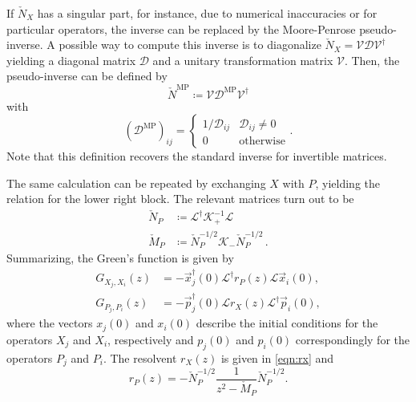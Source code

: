 \documentclass[
    reprint, 
    aps,
    preprintnumbers,
    twocolumn,
    prb,
    superscriptaddress
]{revtex4-2}
\newcommand{\bs}{\begin{subequations}}
\newcommand{\es}{\end{subequations}}
\begin{document}
If $\check{N}_X$ has a singular part, for instance, due to numerical inaccuracies or for particular operators, 
the inverse can be replaced by the Moore-Penrose pseudo-inverse. 
A possible way to compute this inverse is to diagonalize 
$\check{N}_X = \mathcal{V} \mathcal{D} \mathcal{V}^\dagger$ yielding a diagonal matrix $\mathcal{D}$ and a unitary transformation matrix $\mathcal{V}$. 
Then, the pseudo-inverse can be defined by
\begin{equation}
    \check{N}^{\mathrm{MP}} \coloneqq \mathcal{V} \mathcal{D}^{\mathrm{MP}} \mathcal{V}^\dagger
\end{equation}
with
\begin{equation}
    (\mathcal{D}^{\mathrm{MP}})_{ij} = \begin{cases}
        1/\mathcal{D}_{ij} & \mathcal{D}_{ij} \neq 0 \\ 0 & \text{otherwise}
    \end{cases}.
\end{equation}
Note that this definition recovers the standard inverse for invertible matrices.

The same calculation can be repeated by exchanging $X$ with $P$, yielding the relation for the lower right block.
The relevant matrices turn out to be 
\bs
\begin{align}
    \check{N}_P &\coloneqq \mathcal{L}^\dagger \mathcal{K}_+^{-1} \mathcal{L}
		\\
		\check{M}_P &\coloneqq \check{N}_P^{-1/2} \mathcal{K}_- \check{N}_P^{-1/2}\,.
\end{align}
\es
Summarizing, the Green's function is given by
\begin{subequations}
    \begin{align}
        G_{X_j,X_i}  (z) &= - \vec{x}_j^\dagger (0) \mathcal{L}^\dagger r_P (z) \mathcal{L} \vec{x}_i(0), 
				\\
        G_{P_j,P_i} (z) &= - \vec{p}_j^\dagger (0) \mathcal{L} r_X (z) \mathcal{L}^\dagger \vec{p}_i(0),
    \end{align}
\end{subequations}
where the vectors $x_j(0)$ and $x_i(0)$ describe the initial conditions for the operators
$X_j$ and $X_i$, respectively and $p_j(0)$ and $p_i(0)$ correspondingly for the operators
$P_j$ and $P_i$. The resolvent $r_X (z)$ is given in \eqref{eqn:rx} and 
\begin{equation}
    r_P (z) = -\check{N}_P^{-1/2} \frac{1}{z^2 - \check{M}_P} \check{N}_P^{-1/2} .
\end{equation}
\end{document}
